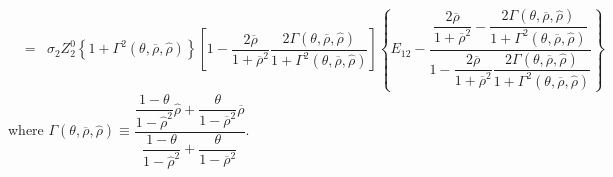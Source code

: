 \documentclass[10pt]{article}
\begin{document}
{\begin{eqnarray*}
& = & \sigma_2 Z_2^0 \left\{ 1 + \Gamma^2 (\theta, \overline{\rho}, {\hat \rho}) \right\} \left[ 1 - \dfrac{2 \overline{\rho}}{1 + \overline{\rho}^2} \dfrac{2 \Gamma (\theta, \overline{\rho}, {\hat \rho})}{1 + \Gamma^2 (\theta, \overline{\rho}, {\hat \rho})} 
\right] \left\{ E_{1 2} - \dfrac{\dfrac{2 \overline{\rho}}{1 + \overline{\rho}^2} - \dfrac{2 \Gamma (\theta, \overline{\rho}, {\hat \rho})}{1 + \Gamma^2 (\theta, \overline{\rho}, {\hat \rho})}}{1 - \dfrac{2 \overline{\rho}}{1 + \overline{\rho}^2} \dfrac{2 \Gamma (\theta, \overline{\rho}, {\hat \rho})}{1 + \Gamma^2 (\theta, \overline{\rho}, {\hat \rho})}} \right\}
\end{eqnarray*}}
where {\footnotesize $ \Gamma (\theta, \overline{\rho}, {\hat \rho}) \equiv \dfrac{\dfrac{1 - \theta}{1 - {\hat \rho}^2} {\hat \rho} + \dfrac{\theta}{1 - \overline{\rho}^2} \overline{\rho}}{\dfrac{1 - \theta}{1 - {\hat \rho}^2} + \dfrac{\theta}{1 - \overline{\rho}^2}} $}.
\end{document}
